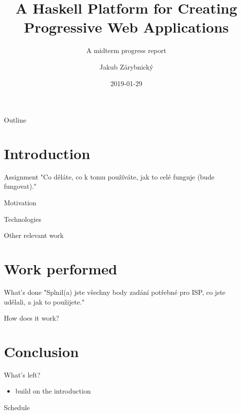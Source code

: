\documentclass[presentation]{beamer}
\author{Jakub Zárybnický}
\date{2019-01-29}
\title{A Haskell Platform for Creating Progressive Web Applications}
\subtitle{A midterm progress report}
\begin{document}
\maketitle
\begin{frame}{Outline}
\tableofcontents
\end{frame}


\section{Introduction}
\label{sec:org2b35d6a}
\begin{frame}[label={sec:org155e4f5}]{Assignment}
"Co děláte, co k tomu používáte, jak to celé funguje (bude fungovat)."
\end{frame}

\begin{frame}[label={sec:org8b7bd2b}]{Motivation}
\end{frame}

\begin{frame}[label={sec:org386f555}]{Technologies}
\end{frame}

\begin{frame}[label={sec:org3116a91}]{Other relevant work}
\end{frame}

\section{Work performed}
\label{sec:org37dfdd5}
\begin{frame}[label={sec:org4fec038}]{What's done}
"Splnil(a) jste všechny body zadání potřebné pro ISP, co jste udělali, a jak to použijete."
\end{frame}

\begin{frame}[label={sec:org914418b}]{How does it work?}
\end{frame}

\section{Conclusion}
\label{sec:orgf9c5c15}
\begin{frame}[label={sec:org37e5b09}]{What's left?}
\begin{itemize}
\item build on the introduction
\end{itemize}
\end{frame}

\begin{frame}[label={sec:orgb6415e9}]{Schedule}
\end{frame}
\end{document}
